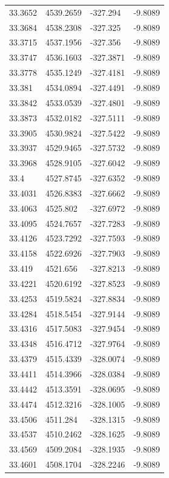 \begin{table}[H]
\begin{tabular}{llll}
33.3652 & 4539.2659 & -327.294 & -9.8089 \\
33.3684 & 4538.2308 & -327.325 & -9.8089 \\
33.3715 & 4537.1956 & -327.356 & -9.8089 \\
33.3747 & 4536.1603 & -327.3871 & -9.8089 \\
33.3778 & 4535.1249 & -327.4181 & -9.8089 \\
33.381 & 4534.0894 & -327.4491 & -9.8089 \\
33.3842 & 4533.0539 & -327.4801 & -9.8089 \\
33.3873 & 4532.0182 & -327.5111 & -9.8089 \\
33.3905 & 4530.9824 & -327.5422 & -9.8089 \\
33.3937 & 4529.9465 & -327.5732 & -9.8089 \\
33.3968 & 4528.9105 & -327.6042 & -9.8089 \\
33.4 & 4527.8745 & -327.6352 & -9.8089 \\
33.4031 & 4526.8383 & -327.6662 & -9.8089 \\
33.4063 & 4525.802 & -327.6972 & -9.8089 \\
33.4095 & 4524.7657 & -327.7283 & -9.8089 \\
33.4126 & 4523.7292 & -327.7593 & -9.8089 \\
33.4158 & 4522.6926 & -327.7903 & -9.8089 \\
33.419 & 4521.656 & -327.8213 & -9.8089 \\
33.4221 & 4520.6192 & -327.8523 & -9.8089 \\
33.4253 & 4519.5824 & -327.8834 & -9.8089 \\
33.4284 & 4518.5454 & -327.9144 & -9.8089 \\
33.4316 & 4517.5083 & -327.9454 & -9.8089 \\
33.4348 & 4516.4712 & -327.9764 & -9.8089 \\
33.4379 & 4515.4339 & -328.0074 & -9.8089 \\
33.4411 & 4514.3966 & -328.0384 & -9.8089 \\
33.4442 & 4513.3591 & -328.0695 & -9.8089 \\
33.4474 & 4512.3216 & -328.1005 & -9.8089 \\
33.4506 & 4511.284 & -328.1315 & -9.8089 \\
33.4537 & 4510.2462 & -328.1625 & -9.8089 \\
33.4569 & 4509.2084 & -328.1935 & -9.8089 \\
33.4601 & 4508.1704 & -328.2246 & -9.8089 \\

\end{tabular}
\end{table}
